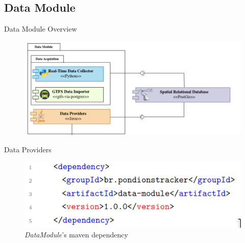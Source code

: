 \documentclass[xcolor=dvipsnames,table]{beamer}
\begin{document}
\subsection{Data Module}
\begin{frame}{Data Module Overview}
        \begin{figure}[H]
                \centering
                \includegraphics[width=\textwidth]{images/datamodule.png}
        \end{figure}
\end{frame}


\begin{frame}{Data Providers}
        \begin{figure}[H]
                \centering
                \includegraphics[scale=0.45]{images/mddatamodule.png}
                \caption{\textit{DataModule}'s maven dependency}
        \end{figure}
\end{frame}
\end{document}
